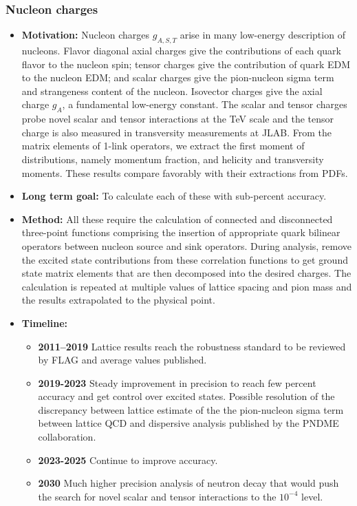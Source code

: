 \documentclass[12pt,hyperpdf]{article}
\begin{document}
\subsubsection{Nucleon charges}\label{sec:nuccharges}
\begin{itemize}
    \item{\bf Motivation:} Nucleon charges $g_{A,S,T}$ arise in many
      low-energy description of nucleons. Flavor diagonal axial
      charges give the contributions of each quark flavor to the
      nucleon spin; tensor charges give the contribution of quark EDM
      to the nucleon EDM; and scalar charges give the pion-nucleon sigma term and strangeness content of the nucleon. 
      Isovector charges give the axial charge $g_A$, a fundamental low-energy constant. The scalar and tensor 
      charges probe novel scalar and tensor interactions at the TeV scale and the tensor charge is also 
      measured in transversity measurements at JLAB. From the matrix elements of 1-link operators, we extract 
      the first moment of distributions, namely momentum fraction, and helicity and transversity moments. These 
      results compare favorably with their extractions from PDFs.
    \item{\bf Long term goal:} To calculate each of these with sub-percent accuracy. 
    \item{\bf Method:} All these require the calculation of connected and disconnected three-point
      functions comprising the insertion of appropriate quark bilinear operators between 
      nucleon source and sink operators. During analysis, remove the
      excited state contributions from these correlation functions to
      get ground state matrix elements that are then decomposed into
      the desired charges. The calculation is repeated at
      multiple values of lattice spacing and pion mass and the results
      extrapolated to the physical point.
\item{\bf Timeline:}
\begin{itemize}
    \item{\bf 2011--2019} Lattice results reach the robustness standard to be reviewed by FLAG and average values published.
    \item{\bf 2019-2023} Steady improvement in precision to reach few  percent accuracy and get control over excited states. 
      Possible resolution of the discrepancy between lattice estimate of the the pion-nucleon sigma term between lattice QCD and 
      dispersive analysis published by the PNDME collaboration. 
    \item{\bf 2023-2025} Continue to improve accuracy. 
    \item{\bf 2030} Much higher precision analysis of neutron decay that
      would push the search for novel scalar and tensor interactions to the $10^{-4}$ level. 
\end{itemize}
\end{itemize}
\end{document}
